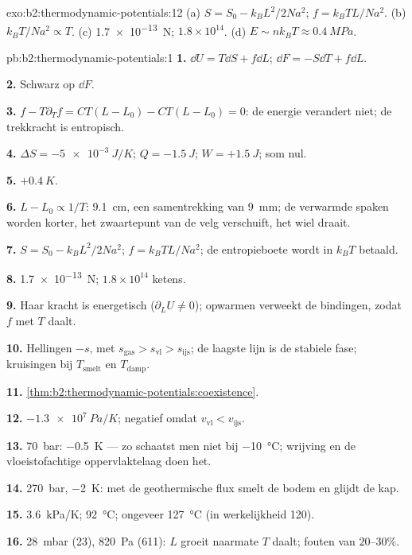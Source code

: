 \begin{solution}{exo:b2:thermodynamic-potentials:12}
(a) $S = S_0 - k_BL^2/2Na^2$; $f = k_BTL/Na^2$. (b) $k_BT/Na^2 \propto T$. (c)
\qty{1.7e-13}{N}; $1.8 \times 10^{14}$. (d) $E \sim nk_BT \approx \qty{0.4}{MPa}$.
\end{solution}

\begin{solution}{pb:b2:thermodynamic-potentials:1}
\textbf{1.} $\dd U = T\dd S + f\dd L$; $\dd F = -S\dd T + f\dd L$.

\textbf{2.} Schwarz op $\dd F$.

\textbf{3.} $f - T\partial_Tf = CT(L - L_0) - CT(L - L_0) = 0$: de energie
verandert niet; de trekkracht is entropisch.

\textbf{4.} $\Delta S = \qty{-5e-3}{J/K}$; $Q = \qty{-1.5}{J}$;
$W = +\qty{1.5}{J}$; som
nul.

\textbf{5.} $+\qty{0.4}{K}$.

\textbf{6.} $L - L_0 \propto 1/T$: \qty{9.1}{cm}, een samentrekking van
\qty{9}{mm}; de
verwarmde spaken worden korter, het zwaartepunt van de velg verschuift, het wiel
draait.

\textbf{7.} $S = S_0 - k_BL^2/2Na^2$; $f = k_BTL/Na^2$; de entropieboete wordt
in $k_BT$ betaald.

\textbf{8.} \qty{1.7e-13}{N}; $1.8 \times 10^{14}$ ketens.

\textbf{9.} Haar kracht is energetisch ($\partial_LU \ne 0$); opwarmen verweekt
de bindingen, zodat $f$ met $T$ daalt.

\textbf{10.} Hellingen $-s$, met
$s_{\text{gas}} > s_{\text{vl}} > s_{\text{ijs}}$; de
laagste lijn is de stabiele fase; kruisingen bij $T_{\text{smelt}}$ en
$T_{\text{damp}}$.

\textbf{11.} \cref{thm:b2:thermodynamic-potentials:coexistence}.

\textbf{12.} $\qty{-1.3e7}{Pa/K}$; negatief omdat $v_{\text{vl}} < v_{\text{ijs}}$.

\textbf{13.} \qty{70}{bar}: \qty{-0.5}{K} --- zo schaatst men niet bij
\qty{-10}{\celsius}; wrijving en de vloeistofachtige oppervlaktelaag doen het.

\textbf{14.} \qty{270}{bar}, \qty{-2}{K}: met de geothermische flux smelt de
bodem en glijdt de kap.

\textbf{15.} \qty{3.6}{kPa/K}; \qty{92}{\celsius}; ongeveer \qty{127}{\celsius}
(in werkelijkheid \qty{120}{}).

\textbf{16.} \qty{28}{mbar} (\qty{23}{}), \qty{820}{Pa} (\qty{611}{}): $L$
groeit naarmate $T$
daalt; fouten van $20$--$30\%$.


\end{solution}
